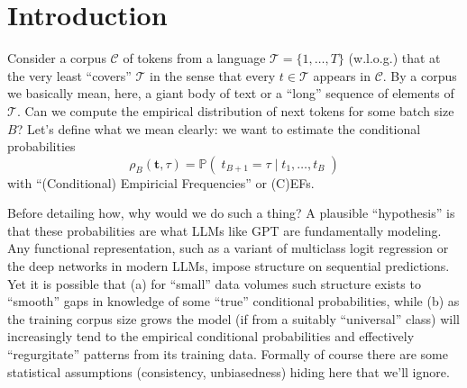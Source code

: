\documentclass[11pt, oneside]{amsart}   	%
\title{}
\author{W. Ross Morrow}
\date{}							%
\begin{document}
\maketitle

\section{Introduction}

Consider a corpus $\mathcal{C}$ of tokens from a language $\mathcal{T} = \{1,\dotsc,T\}$ (w.l.o.g.) that at the very least ``covers'' $\mathcal{T}$ in the sense that every $t \in \mathcal{T}$ appears in $\mathcal{C}$. By a corpus we basically mean, here, a giant body of text or a ``long'' sequence of elements of $\mathcal{T}$. Can we compute the empirical distribution of next tokens for some batch size $B$? Let's define what we mean clearly: we want to estimate the conditional probabilities
\begin{equation*}
	\rho_B(\mathbf{t}, \tau) = \mathbb{P}(\; t_{B+1} = \tau \; | \; t_1, \dotsc , t_B \; )
\end{equation*}
with ``(Conditional) Empiricial Frequencies'' or (C)EFs. 

Before detailing how, why would we do such a thing? A plausible ``hypothesis'' is that these probabilities are what LLMs like GPT are fundamentally modeling. Any functional representation, such as a variant of multiclass logit regression or the deep networks in modern LLMs, impose structure on sequential predictions. Yet it is possible that (a) for ``small'' data volumes such structure exists to ``smooth'' gaps in knowledge of some ``true'' conditional probabilities, while (b) as the training corpus size grows the model (if from a suitably ``universal'' class) will increasingly tend to the empirical conditional probabilities and effectively ``regurgitate'' patterns from its training data. Formally of course there are some statistical assumptions (consistency, unbiasedness) hiding here that we'll ignore. 
\end{document}
